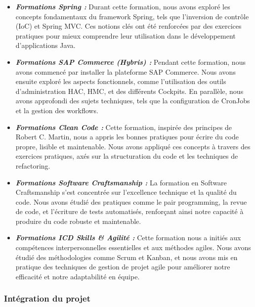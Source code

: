 \begin{itemize}
    \item \textbf{\textit{Formations Spring :}}
    Durant cette formation, nous avons exploré les concepts fondamentaux du framework Spring, tels que l'inversion de contrôle (IoC) et Spring MVC. Ces notions clés ont été renforcées par des exercices pratiques pour mieux comprendre leur utilisation dans le développement d'applications Java.
    \item \textbf{\textit{Formations SAP Commerce (Hybris) :}}
    Pendant cette formation, nous avons commencé par installer la plateforme SAP Commerce. Nous avons ensuite exploré les aspects fonctionnels, comme l'utilisation des outils d'administration HAC, HMC, et des différents Cockpits. En parallèle, nous avons approfondi des sujets techniques, tels que la configuration de CronJobs et la gestion des workflows.
    \item  \textbf{\textit{Formations Clean Code :}}
    Cette formation, inspirée des principes de Robert C. Martin, nous a appris les bonnes pratiques pour écrire du code propre, lisible et maintenable. Nous avons appliqué ces concepts à travers des exercices pratiques, axés sur la structuration du code et les techniques de refactoring.
    \item \textbf{\textit{ Formations Software Craftsmanship :}}
    La formation en Software Craftsmanship s'est concentrée sur l'excellence technique et la qualité du code. Nous avons étudié des pratiques comme le pair programming, la revue de code, et l'écriture de tests automatisés, renforçant ainsi notre capacité à produire du code robuste et maintenable.
    \item \textbf{\textit{Formations ICD Skills \& Agilité :}}
    Cette formation nous a initiés aux compétences interpersonnelles essentielles et aux méthodes agiles. Nous avons étudié des méthodologies comme Scrum et Kanban, et nous avons mis en pratique des techniques de gestion de projet agile pour améliorer notre efficacité et notre adaptabilité en équipe.
\end{itemize}
\subsubsection{Intégration du projet}

